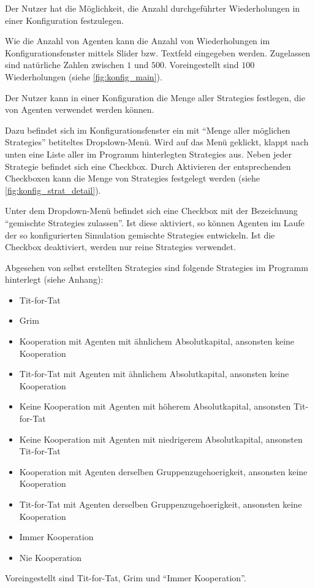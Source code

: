 \documentclass[parskip=full,11pt]{scrartcl}
\begin{document}
Der \Gls{Nutzer} hat die Möglichkeit, die Anzahl durchgeführter Wiederholungen in einer \Gls{Konfiguration} festzulegen.

Wie die Anzahl von Agenten kann die Anzahl von Wiederholungen im Konfigurationsfenster mittels Slider bzw. Textfeld eingegeben werden. Zugelassen sind natürliche Zahlen zwischen \(1\) und \(500\). Voreingestellt sind \(100\) Wiederholungen (siehe \cref{fig:konfig_main}).

Der \Gls{Nutzer} kann in einer \Gls{Konfiguration} die Menge aller \Glspl{Strategie} festlegen, die von Agenten verwendet werden können.

Dazu befindet sich im Konfigurationsfenster ein mit \enquote{Menge aller möglichen \Glspl{Strategie}} betiteltes Dropdown-Menü. Wird auf das Menü geklickt, klappt nach unten eine Liste aller im Programm hinterlegten \Glspl{Strategie} aus. Neben jeder \Gls{Strategie} befindet sich eine Checkbox. Durch Aktivieren der entsprechenden Checkboxen kann die Menge von \Glspl{Strategie} festgelegt werden (siehe \cref{fig:konfig_strat_detail}).

Unter dem Dropdown-Menü befindet sich eine Checkbox mit der Bezeichnung \enquote{\Glspl{gemischte Strategie} zulassen}. Ist diese aktiviert, so können Agenten im Laufe der so konfigurierten Simulation \glspl{gemischte Strategie} entwickeln. Ist die Checkbox deaktiviert, werden nur reine \Glspl{Strategie} verwendet.

Abgesehen von selbst erstellten \Glspl{Strategie} sind folgende \Glspl{Strategie} im Programm hinterlegt (siehe Anhang):
\begin{itemize} \itemsep -10pt
\item Tit-for-Tat
\item Grim
\item Kooperation mit Agenten mit ähnlichem Absolutkapital, ansonsten keine Kooperation
\item Tit-for-Tat mit Agenten mit ähnlichem Absolutkapital, ansonsten keine Kooperation
\item Keine Kooperation mit Agenten mit höherem Absolutkapital, ansonsten Tit-for-Tat
\item Keine Kooperation mit Agenten mit niedrigerem Absolutkapital, ansonsten Tit-for-Tat
\item Kooperation mit Agenten derselben \Gls{Gruppenzugehoerigkeit}, ansonsten keine Kooperation
\item Tit-for-Tat mit Agenten derselben \Gls{Gruppenzugehoerigkeit}, ansonsten keine Kooperation
\item Immer Kooperation
\item Nie Kooperation
\end{itemize}
Voreingestellt sind Tit-for-Tat, Grim und \enquote{Immer Kooperation}.
\end{document}
